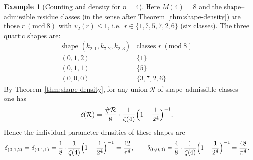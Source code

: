\documentclass[12pt,a4paper,oneside]{amsart}
\theoremstyle{definition}
\newtheorem{example}[theorem]{Example}
\begin{document}
\begin{example}[Counting and density for $n=4$]\label{ex:count-n4}
Here $M(4)=8$ and the shape--admissible residue classes (in the sense after Theorem~\ref{thm:shape-density}) are those $r\ (\mathrm{mod}\ 8)$ with $v_2(r)\le 1$, i.e.\ $r\in\{1,3,5,7,2,6\}$ (six classes). The three quartic shapes are:
\[
\begin{array}{c|c}
\text{shape }(k_{2,1},k_{2,2},k_{2,3}) & \text{classes }r\ (\mathrm{mod}\ 8)\\ \hline
(0,1,2) & \{1\}\\
(0,1,1) & \{5\}\\
(0,0,0) & \{3,7,2,6\}
\end{array}
\]
By Theorem~\ref{thm:shape-density}, for any union $\mathcal R$ of shape--admissible classes one has
\[
\delta(\mathcal R)=\frac{\#\mathcal R}{8}\cdot \frac{1}{\zeta(4)}\Bigl(1-\frac1{2^4}\Bigr)^{-1}.
\]
Hence the individual parameter densities of these shapes are
\[
\delta_{(0,1,2)}=\delta_{(0,1,1)}=\frac{1}{8}\cdot \frac{1}{\zeta(4)}\Bigl(1-\frac1{2^4}\Bigr)^{-1}
=\frac{12}{\pi^4},\qquad
\delta_{(0,0,0)}=\frac{4}{8}\cdot \frac{1}{\zeta(4)}\Bigl(1-\frac1{2^4}\Bigr)^{-1}
=\frac{48}{\pi^4}.
\]
\end{example}
\end{document}
